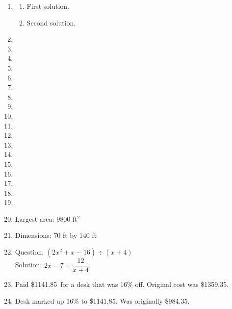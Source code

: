 \documentclass[12pt]{amsart}
\begin{document}
\begin{enumerate}
\item \begin{enumerate}
\item First solution.
\item Second solution.
\end{enumerate}
 \item   \item   \item   \item   \item   \item   \item   \item   \item   \item   \item   \item   \item   \item  \item   \item   \item   \item  \def \x{70}\def \y{140}\def \L{280}\def \area{9800} 
\item  Largest area: $\area$ ft$^2$
 
\item  Dimensions: $\x$ ft by $\y$ ft
\def \a{4}\def \b{2}\def \c{-7}\def \r{12}\def \monicpol{x^{}+4}\def \longnbad{2x^{2}+x^{}-16}\def \anspol{2x^{}-7}
\item Question: $(\longnbad) \div (\monicpol)$   \\
Solution: $\anspol + \dfrac{\r}{\monicpol}$
\def \discount{16}\def \paid{1141.85}\def \rainy{13.45}\def \orcost{1359.35}\def \purcost{984.35}\def \orrainy{16.01}
\item Paid \$\paid\ for a desk that was \discount\% off. Original cost was \$\orcost. 

\item Desk marked up \discount\% to \$\paid. Was originally \$\purcost. 


\end{enumerate}
\end{document}
